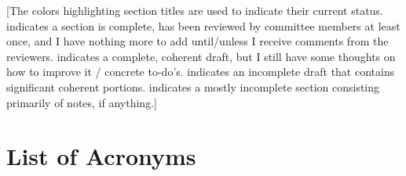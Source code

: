 \setcounter{tocdepth}{4}

\cleardoublepage


\begingroup
\let\clearpage\endgroup

[The colors highlighting section titles are used to indicate their current status.  indicates a section is complete, has been reviewed by committee members at least once, and I have nothing more to add until/unless I receive comments from the reviewers.  indicates a complete, coherent draft, but I still have some thoughts on how to improve it / concrete to-do's. \hlc[yellow]{Yellow]} indicates an incomplete draft that contains significant coherent portions.  indicates a mostly incomplete section consisting primarily of notes, if anything.]

\tableofcontents
\newpage
\listoffigures
\newpage
\listoftables
\newpage
\chapter*{List of Acronyms}

